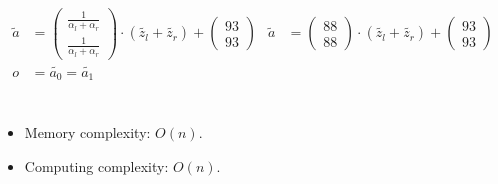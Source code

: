 \begin{align*}
%
\widetilde{a} &=
\begin{pmatrix}\frac{1}{\alpha_l+\alpha_r}\\
\frac{1}{\alpha_l+\alpha_r}\end{pmatrix}
\cdot (\widetilde{z_l} + \widetilde{z_r}) +
\begin{pmatrix}93\\93\end{pmatrix}
&
\widetilde{a} &=
\begin{pmatrix}88\\88\end{pmatrix}
\cdot (\widetilde{z_l} + \widetilde{z_r}) +
\begin{pmatrix}93\\93\end{pmatrix}\\
%
o &= \widetilde{a_0} = \widetilde{a_1} \\
\end{align*}\\


%
%


\begin{itemize}

  \item Memory complexity: $O(n)$.

  \item Computing complexity: $O(n)$.

\end{itemize}



